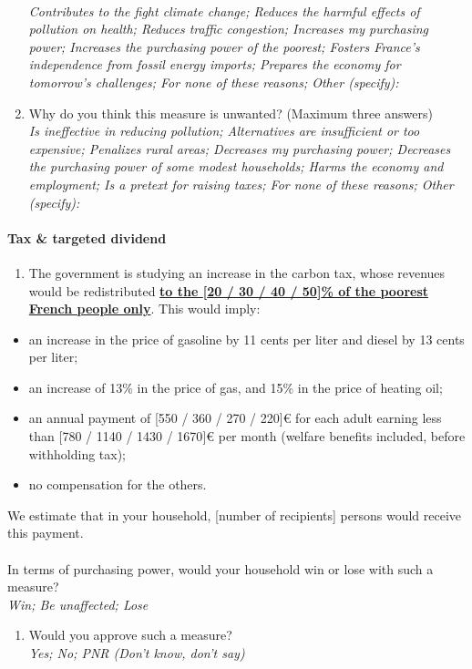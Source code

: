 \documentclass[12pt]{article} %
\begin{document}
\begin{appendices}
\begin{enumerate}[resume,leftmargin=*]
\emph{}\\
\emph{Contributes to the fight climate change; Reduces the harmful
effects of pollution on health; Reduces traffic congestion; Increases
my purchasing power; Increases the purchasing power of the poorest;
Fosters France's independence from fossil energy imports; Prepares
the economy for tomorrow's challenges; For none of these reasons;
Other (specify): }
\item Why do you think this measure is unwanted? (Maximum three answers)
\emph{}\\
\emph{Is ineffective in reducing pollution; Alternatives are insufficient
or too expensive; Penalizes rural areas; Decreases my purchasing power;
Decreases the purchasing power of some modest households; Harms the
economy and employment; Is a pretext for raising taxes; For none of
these reasons; Other (specify):} 
\end{enumerate}

\paragraph{Tax \& targeted dividend}
\begin{enumerate}[resume,leftmargin=*]
\item The government is studying an increase in the carbon tax, whose revenues
would be redistributed \textbf{\underline{to the {[}20 / 30 / 40 /
50{]}\% of the poorest French people only}}. This would imply: 
\end{enumerate}
\begin{itemize}
\item an increase in the price of gasoline by 11 cents per liter and diesel
by 13 cents per liter; 
\item an increase of 13\% in the price of gas, and 15\% in the price of
heating oil; 
\item an annual payment of {[}550 / 360 / 270 / 220{]}\euro{} for each adult earning
less than {[}780 / 1140 / 1430 / 1670{]}\euro{} per month (welfare benefits
included, before withholding tax); 
\item no compensation for the others. 
\end{itemize}
We estimate that in your household, {[}number of recipients{]} persons
would receive this payment. \\
\\
In terms of purchasing power, would your household win or lose with
such a measure? \emph{}\\
\emph{Win; Be unaffected; Lose}
\begin{enumerate}[resume,leftmargin=*]
\item Would you approve such a measure? \emph{}\\
\emph{Yes; No; PNR (Don't know, don't say)} 
\end{enumerate}


\end{appendices}
\end{document}

